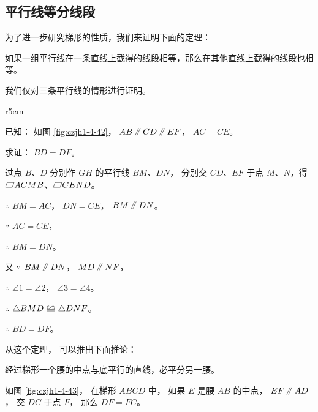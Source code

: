 \subsection{平行线等分线段}\label{subsec:czjh1-4-10}

为了进一步研究梯形的性质，我们来证明下面的定理：

\begin{dingli}[平行线等分线段定理]
    如果一组平行线在一条直线上截得的线段相等，那么在其他直线上截得的线段也相等。
\end{dingli}

我们仅对三条平行线的情形进行证明。

\begin{wrapfigure}[8]{r}{5cm}
    \centering
    
    \caption{}\label{fig:czjh1-4-42}
\end{wrapfigure}


已知： 如图 \ref{fig:czjh1-4-42}， $AB \pingxing CD \pingxing EF$， $AC = CE$。

求证： $BD = DF$。

\zhengming  过点 $B$、$D$ 分别作 $GH$ 的平行线 $BM$、$DN$，
分别交 $CD$、$EF$ 于点 $M$、$N$，得 $\pxsbx ACMB$、$\pxsbx CEND$。

$\therefore$ \quad $BM = AC$， $DN = CE$， $BM \pingxing DN$。

$\because$ \quad $AC = CE$，

$\therefore$ \quad $BM = DN$。

又 $\because$ \quad $BM \pingxing DN$， $MD \pingxing NF$，

$\therefore$ \quad $\angle 1 = \angle 2$， $\angle 3 = \angle 4$。

$\therefore$ \quad $\triangle BMD \quandeng \triangle DNF$。

$\therefore$ \quad $BD = DF$。

从这个定理， 可以推出下面推论：

\begin{tuilun}[推论1]
    经过梯形一个腰的中点与底平行的直线，必平分另一腰。
\end{tuilun}

如图 \ref{fig:czjh1-4-43}， 在梯形 $ABCD$ 中， 如果 $E$ 是腰 $AB$ 的中点，
$EF \pingxing AD$， 交 $DC$ 于点 $F$， 那么 $DF = FC$。

\begin{figure}[htbp]
    \centering
    \begin{minipage}[b]{7cm}
        \centering
        
        \caption{}\label{fig:czjh1-4-43}
    \end{minipage}
    \qquad
    \begin{minipage}[b]{7cm}
        \centering
        
        \caption{}\label{fig:czjh1-4-44}
    \end{minipage}
\end{figure}

